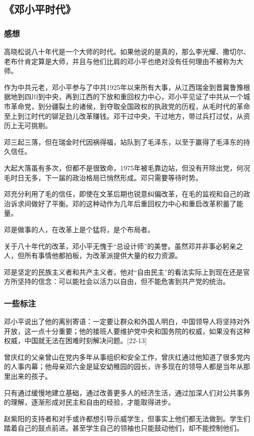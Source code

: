 \subsection{《邓小平时代》}
\subsubsection{感想}
高晓松说八十年代是一个大师的时代。如果他说的是真的，那么李光耀、撒切尔、老布什肯定算是大师，并且与他们比肩的邓小平也绝对没有任何理由不被称为大师。

作为中共元老，邓小平参与了中共1925年以来所有大事，从江西瑞金到晋冀鲁豫根据地到四川到中央，再到江西的下放和重回权力中心，邓小平见证了中共从一个城市革命党，到分疆裂土的诸侯，到夺取全国政权的执政党的历程，从毛时代的革命至上到江时代的铆足劲儿改革赚钱。邓干过中央，干过地方，带过兵打过仗，从资历上无可挑剔。

邓三起三落，但在瑞金时代因祸得福，站队到了毛泽东，以至于赢得了毛泽东的持久信任。

大起大落虽有多次，但都不是很致命，1975年被毛靠边站，但没有开除出党，何况毛时日无多，下一届的政治格局已悄然形成。邓只需要等待时势。

邓充分利用了毛的信任，即使在文革后期也锐意纠偏改革，在毛的监视和自己的政治诉求间做好了平衡。邓的这种动作为几年后重回权力中心和重启改革积蓄了能量。

邓是做事的人，在改革上是个猛将，是个布局者。

关于八十年代的改革，邓小平无愧于“总设计师”的美誉。虽然邓并非事必躬亲之人，但所有事情他都拍板，为改革派提供大量的权力资源。

邓是坚定的民族主义者和共产主义者，他对“自由民主”的看法实际上到现在还是官方所坚持的信念：可以能社会以活力以自由，但不能危害到共产党的统治。

\subsubsection{一些标注}
邓小平说出了他的离别寄语：一定要让群众和外国人明白，中国领导人将坚持对外开放，这一点十分重要；他的接班人要维护党中央和国务院的权威，如果没有这种权威，中国就无法在困难时刻解决问题。[22-13]

曾庆红的父亲曾山在党内多年从事组织和安全工作，曾庆红通过他知道了很多党内的人事内幕；他母亲邓六金是延安幼稚园的园长，许多现在的领导人都是当年从那里出来的孩子。

只有通过缓慢地建立基础，通过改善更多人的经济生活，通过加深人们对公共事务的理解，逐渐形成对民主和自由的经验，才能取得进步。

赵紫阳的支持者和对手或许都想引导示威学生，但事实上他们都无法做到。学生们踏着自己的鼓点前进。甚至学生自己的领袖也只能鼓动他们，却不能控制他们。

